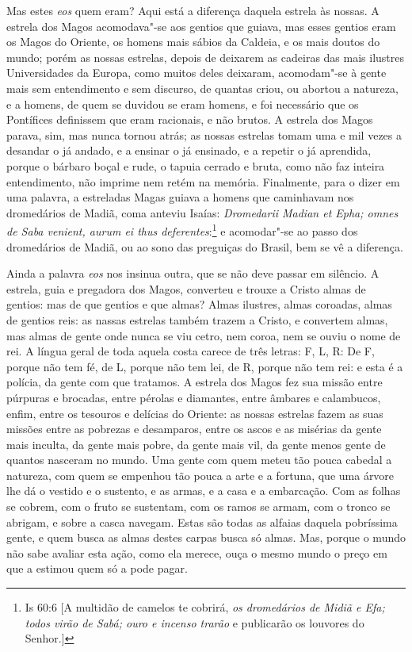 Mas estes \emph{eos} quem eram? Aqui está a diferença daquela
estrela às nossas. A estrela dos Magos acomodava"-se aos gentios que
guiava, mas esses gentios eram os Magos do Oriente, os homens mais
sábios da Caldeia, e os mais doutos do mundo; porém as nossas estrelas,
depois de deixarem as cadeiras das mais ilustres Universidades da Europa,
como muitos deles deixaram, acomodam"-se à gente mais sem
entendimento e sem discurso, de quantas criou, ou abortou a natureza, e
a homens, de quem se duvidou se eram homens, e foi necessário que os
Pontífices definissem que eram racionais, e não brutos. A estrela dos
Magos parava, sim, mas nunca tornou atrás; as nossas estrelas tomam uma
e mil vezes a desandar o já andado, e a ensinar o já ensinado, e a
repetir o já aprendida, porque o bárbaro boçal e rude, o tapuia cerrado
e bruta, como não faz inteira entendimento, não imprime nem retém na
memória. Finalmente, para o dizer em uma palavra, a estreladas Magas
guiava a homens que caminhavam nos dromedários de Madiã, coma anteviu
Isaías: \emph{Dromedarii Madian et Epha; omnes de Saba venient, aurum ei
thus deferentes}:\footnote{Is 60:6 [A multidão de camelos te cobrirá, \emph{os dromedários de Midiã e Efa; todos virão de Sabá; ouro e incenso trarão} e publicarão os louvores do Senhor.]} e acomodar"-se ao passo dos dromedários
de Madiã, ou ao sono das preguiças do Brasil, bem se vê a diferença.

Ainda a palavra \emph{eos} nos insinua outra, que se não deve passar em
silêncio. A estrela, guia e pregadora dos Magos, converteu e trouxe a
Cristo almas de gentios: mas de que gentios e que almas? Almas ilustres,
almas coroadas, almas de gentios reis: as nassas estrelas também trazem
a Cristo, e convertem almas, mas almas de gente onde nunca se viu cetro,
nem coroa, nem se ouviu o nome de rei. A língua geral de toda aquela
costa carece de três letras: F, L, R: De F, porque não tem fé, de L,
porque não tem lei, de R, porque não tem rei: e esta é a polícia, da
gente com que tratamos. A estrela dos Magos fez sua missão entre
púrpuras e brocadas, entre pérolas e diamantes, entre âmbares e
calambucos, enfim, entre os tesouros e delícias do Oriente: as nossas
estrelas fazem as suas missões entre as pobrezas e desamparos, entre os
ascos e as misérias da gente mais inculta, da gente mais pobre, da gente
mais vil, da gente menos gente de quantos nasceram no mundo. Uma gente
com quem meteu tão pouca cabedal a natureza, com quem se empenhou tão
pouca a arte e a fortuna, que uma árvore lhe dá o vestido e o sustento,
e as armas, e a casa e a embarcação. Com as folhas se cobrem, com o
fruto se sustentam, com os ramos se armam, com o tronco se abrigam, e
sobre a casca navegam. Estas são todas as alfaias daquela pobríssima
gente, e quem busca as almas destes carpas busca só almas. Mas, porque o
mundo não sabe avaliar esta ação, como ela merece, ouça o mesmo mundo o
preço em que a estimou quem só a pode pagar.

